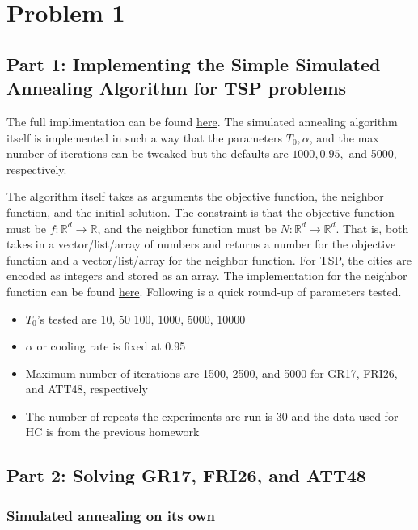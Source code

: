 \section*{Problem 1}

\subsection*{Part 1: Implementing the Simple Simulated Annealing Algorithm for TSP problems}

The full implimentation can be found \href{https://github.com/nngerncham/ma395_heuristic/tree/main/homework/hw2/code/simulated_annealing}{here}. The simulated annealing algorithm itself is implemented in such a way that the parameters \(T_0, \alpha\), and the max number of iterations can be tweaked but the defaults are \(1000, 0.95,\) and 5000, respectively.

The algorithm itself takes as arguments the objective function, the neighbor function, and the initial solution. The constraint is that the objective function must be \(f: \mathbb{R}^d \to \mathbb{R}\), and the neighbor function must be \(N: \mathbb{R}^d \to \mathbb{R}^d\). That is, both takes in a vector/list/array of numbers and returns a number for the objective function and a vector/list/array for the neighbor function. For TSP, the cities are encoded as integers and stored as an array. The implementation for the neighbor function can be found \href{https://github.com/nngerncham/ma395_heuristic/blob/main/homework/hw2/code/simulated_annealing/tsp_neighbors.py}{here}. Following is a quick round-up of parameters tested.
\begin{itemize}
    \item \(T_0\)'s tested are 10, 50 100, 1000, 5000, 10000
    \item \(\alpha\) or cooling rate is fixed at 0.95
    \item Maximum number of iterations are 1500, 2500, and 5000 for GR17, FRI26, and ATT48, respectively
    \item The number of repeats the experiments are run is 30 and the data used for HC is from the previous homework
\end{itemize}

\subsection*{Part 2: Solving GR17, FRI26, and ATT48}

\subsubsection*{Simulated annealing on its own}

